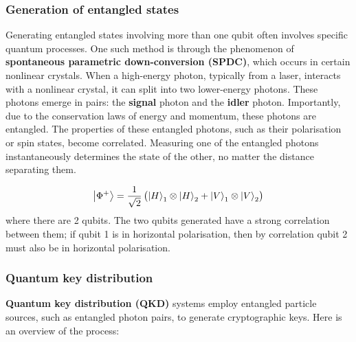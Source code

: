 \documentclass[12pt,a4paper]{article}
\begin{document}
\subsubsection{Generation of entangled states}
Generating entangled states involving more than one qubit often involves specific quantum processes. One such method is through the phenomenon of \textbf{spontaneous parametric down-conversion (SPDC)}, which occurs in certain nonlinear crystals. When a high-energy photon, typically from a laser, interacts with a nonlinear crystal, it can split into two lower-energy photons. These photons emerge in pairs: the \textbf{signal} photon and the \textbf{idler} photon. Importantly, due to the conservation laws of energy and momentum, these photons are entangled. The properties of these entangled photons, such as their polarisation or spin states, become correlated. Measuring one of the entangled photons instantaneously determines the state of the other, no matter the distance separating them.

\begin{equation}
\ket{\Phi^+} = \frac{1}{\sqrt{2}}\left(\ket{H}_1 \otimes \ket{H}_2 + \ket{V}_1 \otimes \ket{V}_2\right)
\end{equation}
where there are 2 qubits. The two qubits generated have a strong correlation between them; if qubit 1 is in horizontal polarisation, then by correlation qubit 2 must also be in horizontal polarisation.

\subsubsection{Quantum key distribution}
\textbf{Quantum key distribution (QKD)} systems employ entangled particle sources, such as entangled photon pairs, to generate cryptographic keys. Here is an overview of the process:
\end{document}

